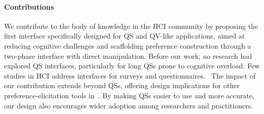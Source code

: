 
\paragraph{Contributions}
We contribute to the body of knowledge in the HCI community by proposing the first interface specifically designed for QS and QV-like applications, aimed at reducing cognitive challenges and scaffolding preference construction through a two-phase interface with direct manipulation. Before our work, no research had explored QS interfaces, particularly for long QSs prone to cognitive overload. Few studies in HCI address interfaces for surveys and questionnaires.~ The impact of our contribution extends beyond QSs, offering design implications for other preference-elicitation tools in~. By making QSs easier to use and more accurate, our design also encourages wider adoption among researchers and practitioners.~


